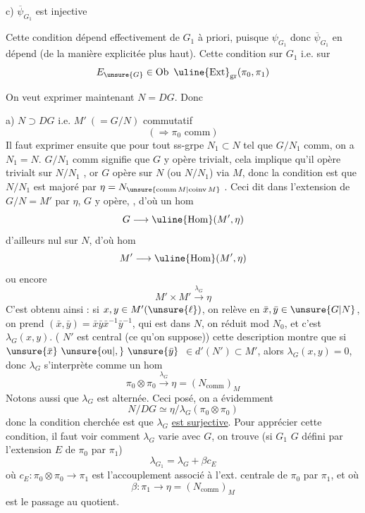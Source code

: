 c) $\overline\psi_{G_1}$ est injective

Cette condition dépend effectivement de
$G_1$ à priori, puisque $\psi_{G_1}$ donc $\overline\psi_{G_1}$ en
dépend (de la manière explicitée plus
haut). Cette condition sur $G_1$ i.e. sur
\[
E_{\unsure{G}}\in\operatorname{Ob}\ \uline{\operatorname{Ext}}_{\mathrm{gr}}(\pi_0,\pi_1)
\]


On veut exprimer maintenant
$N=DG$. Donc

 a) $N\supset DG$ i.e. $M'\ (=G/N)$ commutatif
\[
(\Longrightarrow\pi_0\text{ comm})
\]
Il faut exprimer ensuite que pour tout
ss-grpe  $N_1\subset N$ tel que $G/N_1$ comm, on a
$N_1=N$. $G/N_1$ comm signifie que $G$ y
opère trivialt, cela implique qu'il opère
trivialt sur $N/N_1$ , or $G$ opère sur $N$
(ou $N/N_1$) via $M$, donc la condition est que
 $N/N_1$ est majoré par $\eta=N_{\unsure{\mathrm{comm}\,M|\mathrm{coinv}\,M}}$ .
Ceci dit dans l'extension  de $G/N=M'$ par
$\eta$, $G$ y opère, , d'où un hom
\[
G\longrightarrow\uline{\operatorname{Hom}}(M',\eta)
\]
d'ailleurs nul sur $N$, d'où hom
\[
M'\longrightarrow\uline{\operatorname{Hom}}(M',\eta)
\]
ou encore
\[
M'\times M'\xrightarrow{\lambda_G}\eta
\]
C'est obtenu ainsi : si $x,y\in M'(\unsure{\ell})$, on relève en
$\bar{x},\bar{y}\in\unsure{G|N}$, on prend $(\bar{x},\bar{y})=\bar{x}\bar{y}\bar{x}^{-1}\bar{y}^{-1}$, qui est
dans $N$, on réduit mod $N_0$, et c'est $\lambda_G(x,y)$.
( $N'$ est central (ce qu'on suppose))
cette description montre que si $\unsure{\bar{x}}\ \unsure{\text{ou}|,}\ \unsure{\bar{y}}$
$\in d'(N')\subset M'$, alors  $\lambda_G(x,y)=0$, donc $\lambda_G$
s'interprète comme un hom
\[
\pi_0\otimes\pi_0\xrightarrow{\lambda_G}\eta=(N_{\mathrm{comm}})_M
\]
Notons aussi que $\lambda_G$ est alternée. Ceci
posé,  on a évidemment
\[
N/DG\simeq\eta/\lambda_G(\pi_0\otimes\pi_0)
\]
donc la condition cherchée est que
$\lambda_G$ \uline{est surjective}. Pour apprécier
cette condition, il faut voir comment
$\lambda_G$ varie avec $G$, on trouve (si $G_1$ 
$G$ défini par l'extension $E$ de $\pi_0$ par $\pi_1$)
\[
\lambda_{G_1}=\lambda_G+\beta c_E
\]
où $c_E:\pi_0\otimes\pi_0\longrightarrow\pi_1$ est l'accouplement
associé à l'ext. centrale de $\pi_0$  par $\pi_1$,
et où
\[
\beta:\pi_1\longrightarrow\eta=(N_{\mathrm{comm}})_M
\]
est le passage au quotient. 

